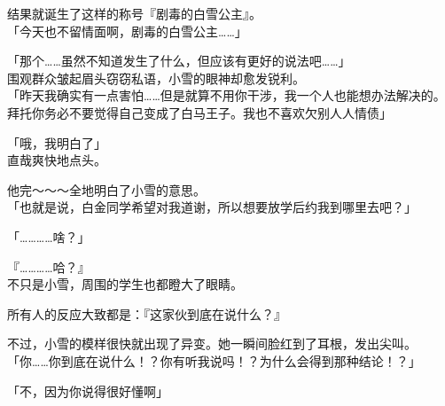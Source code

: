 结果就诞生了这样的称号『剧毒的白雪公主』。\\

「今天也不留情面啊，剧毒的白雪公主……」

「那个……虽然不知道发生了什么，但应该有更好的说法吧……」\\

围观群众皱起眉头窃窃私语，小雪的眼神却愈发锐利。\\

「昨天我确实有一点害怕……但是就算不用你干涉，我一个人也能想办法解决的。拜托你务必不要觉得自己变成了白马王子。我也不喜欢欠别人人情债」

「哦，我明白了」\\

直哉爽快地点头。

他完～～～全地明白了小雪的意思。\\

「也就是说，白金同学希望对我道谢，所以想要放学后约我到哪里去吧？」

「…………啥？」

『…………哈？』\\

不只是小雪，周围的学生也都瞪大了眼睛。

所有人的反应大致都是：『这家伙到底在说什么？』

不过，小雪的模样很快就出现了异变。她一瞬间脸红到了耳根，发出尖叫。\\

「你……你到底在说什么！？你有听我说吗！？为什么会得到那种结论！？」

「不，因为你说得很好懂啊」\\

